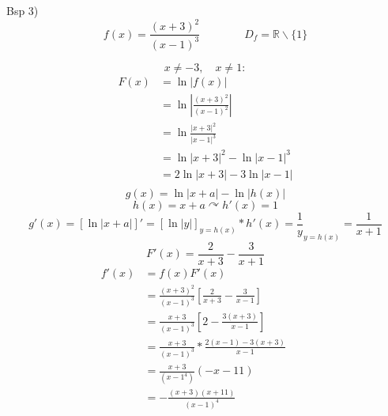 \documentclass{article}
\begin{document}


Bsp 3)
\[f(x)=\frac{(x+3)^2}{(x-1)^3}
\hspace{4em}
D_{f}=\mathbb{R}\backslash\{1\}\]

\[x\neq-3,\hspace{1em}x\neq1:\]
\begin{align*}
F(x)&=\ln|f(x)|\\
&=\ln|\frac{(x+3)^2}{(x-1)^2}|\\
&=\ln\frac{|x+3|^2}{|x-1|^3}\\
&=\ln|x+3|^2-\ln|x-1|^3\\
&=2\ln|x+3|-3\ln|x-1|\\
\end{align*}
\[g(x)=\ln|x+a|-\ln|h(x)|\]
\[h(x)=x+a\curvearrowright h'(x)=1\]
\[g'(x)=[\ln|x+a|]'=[\ln|y|]_{y=h(x)}*h'(x)=\frac{1}{y}_{y=h(x)}=\frac{1}{x+1}\]
\[F'(x)=\frac{2}{x+3}-\frac{3}{x+1}\]
\begin{align*}
f'(x)&=f(x)F'(x)\\
&=\frac{(x+3)^2}{(x-1)^3}[\frac{2}{x+3}-\frac{3}{x-1}]\\
&=\frac{x+3}{(x-1)^3}[2-\frac{3(x+3)}{x-1}]\hspace{4em}\\
&=\frac{x+3}{(x-1)^3}*\frac{2(x-1)-3(x+3)}{x-1}\\
&=\frac{x+3}{(x-1^4)}(-x-11)\\
&=-\frac{(x+3)(x+11)}{(x-1)^4}
\end{align*}


\end{document}
